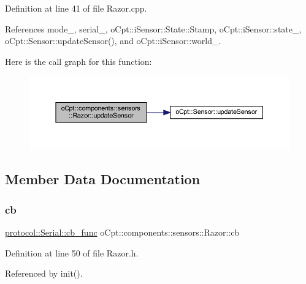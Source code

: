 Definition at line 41 of file Razor.\+cpp.



References mode\+\_\+, serial\+\_\+, o\+Cpt\+::i\+Sensor\+::\+State\+::\+Stamp, o\+Cpt\+::i\+Sensor\+::state\+\_\+, o\+Cpt\+::\+Sensor\+::update\+Sensor(), and o\+Cpt\+::i\+Sensor\+::world\+\_\+.

Here is the call graph for this function\+:
\nopagebreak
\begin{figure}[H]
\begin{center}
\leavevmode
\includegraphics[width=350pt]{classo_cpt_1_1components_1_1sensors_1_1_razor_ac8ee1582eb5c478c73e5e050858d2d7d_cgraph}
\end{center}
\end{figure}


\subsection{Member Data Documentation}
\hypertarget{classo_cpt_1_1components_1_1sensors_1_1_razor_a3fc69162ed59373f966458f2a5e30311}{}\label{classo_cpt_1_1components_1_1sensors_1_1_razor_a3fc69162ed59373f966458f2a5e30311} 
\subsubsection{\texorpdfstring{cb}{cb}}
{\footnotesize\ttfamily \hyperlink{classo_cpt_1_1protocol_1_1_serial_ad55591180be8bea2fe3832b1265b7496}{protocol\+::\+Serial\+::cb\+\_\+func} o\+Cpt\+::components\+::sensors\+::\+Razor\+::cb\hspace{0.3cm}{\ttfamily [private]}}



Definition at line 50 of file Razor.\+h.



Referenced by init().

\hypertarget{classo_cpt_1_1components_1_1sensors_1_1_razor_af566e421b9ea1378e19cffd6bd743860}{}\label{classo_cpt_1_1components_1_1sensors_1_1_razor_af566e421b9ea1378e19cffd6bd743860} 
